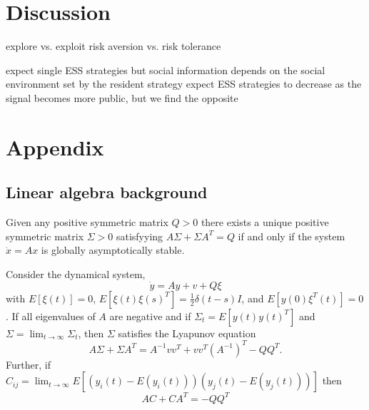 \documentclass{article}
\begin{document}
\section{Discussion}
explore vs. exploit 
risk aversion vs. risk tolerance

expect single ESS strategies but social information depends on the social environment set by the resident strategy
expect ESS strategies to decrease as the signal becomes more public, but we find the opposite

\newpage
\section{Appendix}

\subsection{Linear algebra background }

\begin{theorem} \label{lyapeq_theorem}
Given any positive symmetric matrix $Q>0$ there exists a unique positive symmetric matrix $\Sigma>0$ satisfyying $A\Sigma+\Sigma A^T=Q$ if and only if the system $\dot{x}=Ax$ is globally asymptotically stable.
\end{theorem}

\begin{claim} \label{lyapeq_derivation}
Consider the dynamical system,
\begin{equation}
\dot{y}=Ay+v+Q\xi  \label{tofindsigma}
\end{equation}
with $E[\xi(t)]=0$, $E[\xi(t)\xi(s)^T]=\frac{1}{2}\delta(t-s)I$, and $E[y(0)\xi^T(t)]=0$. If all eigenvalues of $A$ are negative and if $\Sigma_t=E[y(t)y(t)^T]$ and $\Sigma=\lim_{t\to\infty}\Sigma_t$, then $\Sigma$ satisfies the Lyapunov equation
\begin{equation*}
A\Sigma+\Sigma A^T=A^{-1}vv^T+vv^T(A^{-1})^T-QQ^T.
\end{equation*}
Further, if $C_{ij}=\lim_{t\to\infty} E[(y_i(t)-E(y_i(t)))(y_j(t)-E(y_j(t)))]$ then 
\begin{equation*}
AC+CA^T=-QQ^T
\end{equation*}
\end{claim}
\end{document}
